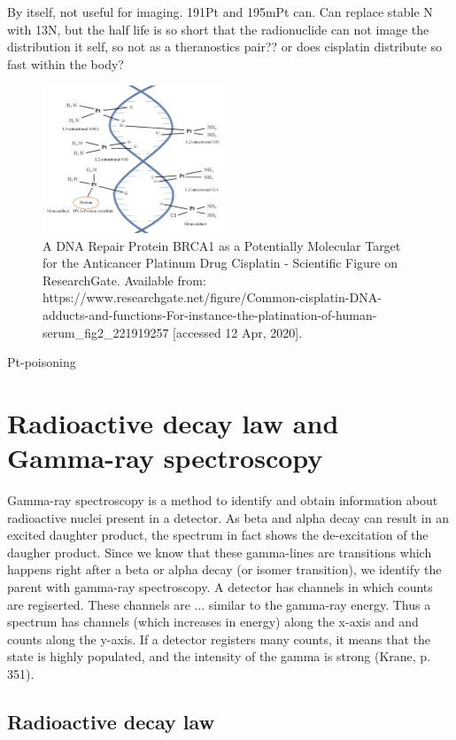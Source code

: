By itself, not useful for imaging. 191Pt and 195mPt can. Can replace stable N with 13N, but the half life is so short that the radionuclide can not image the distribution it self, so not as a theranostics pair?? or does cisplatin distribute so fast within the body? 



\begin{figure}
    \centering
    \includegraphics[width=0.5\textwidth]{Theory/cisplatin_DNA.png}
    \caption{A DNA Repair Protein BRCA1 as a Potentially Molecular Target for the Anticancer Platinum Drug Cisplatin - Scientific Figure on ResearchGate. Available from: https://www.researchgate.net/figure/Common-cisplatin-DNA-adducts-and-functions-For-instance-the-platination-of-human-serum_fig2_221919257 [accessed 12 Apr, 2020]. }
    \label{fig:cisplatin_DNA}
\end{figure}
Pt-poisoning 


\section{Radioactive decay law and Gamma-ray spectroscopy}
Gamma-ray spectroscopy is a method to identify and obtain information about radioactive nuclei present in a detector. As beta and alpha decay can result in an excited daughter product, the spectrum in fact shows the de-excitation of the daugher product. Since we know that these gamma-lines are transitions which happens right after a beta or alpha decay (or isomer transition), we identify the parent with gamma-ray spectroscopy. A detector has channels in which counts are regiserted. These channels are ... similar to the gamma-ray energy. Thus a spectrum has channels (which increases in energy) along the x-axis and and counts along the y-axis. If a detector registers many counts, it means that the state is highly populated, and the intensity of the gamma is strong (Krane, p. 351). 

\subsection{Radioactive decay law}

